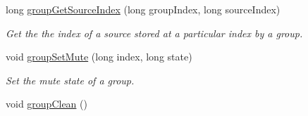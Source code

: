 \begin{DoxyCompactItemize}
long \hyperlink{class_hoa2_d_1_1_sources_manager_aef920b56356ef30de62cc11b3bd5bc8d}{group\-Get\-Source\-Index} (long group\-Index, long source\-Index)
\begin{DoxyCompactList}\small\item\em Get the the index of a source stored at a particular index by a group. \end{DoxyCompactList}\item 
void \hyperlink{class_hoa2_d_1_1_sources_manager_acb69c1d515063c591e1138c24befb332}{group\-Set\-Mute} (long index, long state)
\begin{DoxyCompactList}\small\item\em Set the mute state of a group. \end{DoxyCompactList}\item 
\hypertarget{class_hoa2_d_1_1_sources_manager_a604fbb078ab2598262c72600a07e8a80}{void \hyperlink{class_hoa2_d_1_1_sources_manager_a604fbb078ab2598262c72600a07e8a80}{group\-Clean} ()}\label{class_hoa2_d_1_1_sources_manager_a604fbb078ab2598262c72600a07e8a80}


\end{DoxyCompactItemize}

